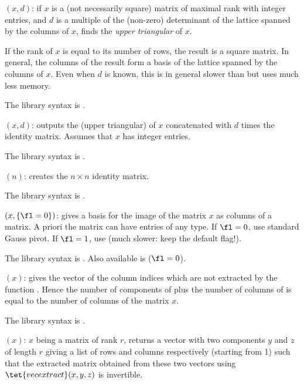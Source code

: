 $(x,d)$: \label{se:mathnfmod}if $x$ is a (not necessarily square) matrix of
maximal rank with integer entries, and $d$ is a multiple of the (non-zero)
determinant of the lattice spanned by the columns of $x$, finds the
\emph{upper triangular}  of $x$.

If the rank of $x$ is equal to its number of rows, the result is a square
matrix. In general, the columns of the result form a basis of the lattice
spanned by the columns of $x$. Even when $d$ is known, this is in general
slower than  but uses much less memory.

The library syntax is .

$(x,d)$: \label{se:mathnfmodid}outputs the (upper triangular)
 of $x$ concatenated with $d$ times
the identity matrix. Assumes that $x$ has integer entries.

The library syntax is .

$(n)$: \label{se:matid}creates the $n\times n$ identity matrix.

The library syntax is .

$(x,\{\fl=0\})$: \label{se:matimage}gives a basis for the image of the
matrix $x$ as columns of a matrix. A priori the matrix can have entries of
any type. If $\fl=0$, use standard Gauss pivot. If $\fl=1$, use
 (much slower: keep the default flag!).

The library syntax is .
Also available is  ($\fl=0$).

$(x)$: \label{se:matimagecompl}gives the vector of the column indices which
are not extracted by the function . Hence the number of
components of  plus the number of columns of
 is equal to the number of columns of the matrix $x$.

The library syntax is .

$(x)$: \label{se:matindexrank}$x$ being a matrix of rank $r$, returns a vector with two
 components $y$ and $z$ of length $r$ giving a list of rows
and columns respectively (starting from 1) such that the extracted matrix
obtained from these two vectors using $\tet{vecextract}(x,y,z)$ is
invertible.

